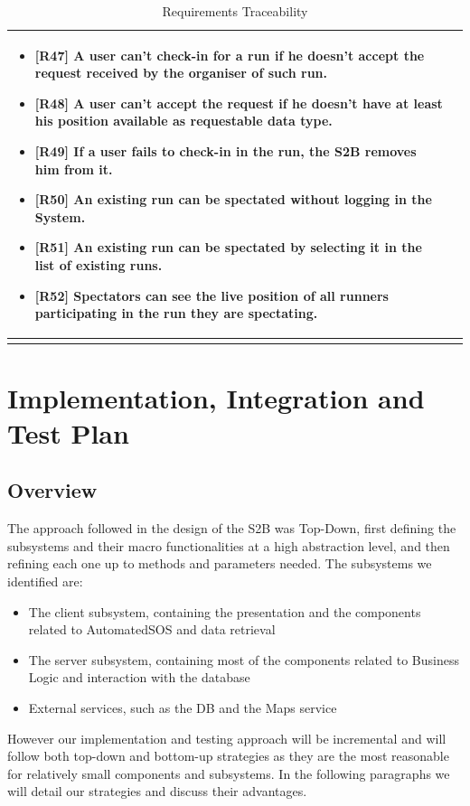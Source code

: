 \documentclass[titlepage]{article}
\begin{document}
\begin{longtable}{| p{5 cm} | p{8 cm} |}
\begin{itemize}
			\item {\bf [R47]} A user can’t check-in for a run if he doesn’t accept the request received by the organiser of such run.
			\item {\bf [R48]} A user can’t accept the request if he doesn’t have at least his position available as requestable data type.
			\item {\bf [R49]} If a user fails to check-in in the run, the S2B removes him from it.
			\item {\bf [R50]} An existing run can be spectated without logging in the System.
			\item {\bf [R51]} An existing run can be spectated by selecting it in the list of existing runs.
			\item {\bf [R52]} Spectators can see the live position of all runners participating in the run they are spectating.
		\end{itemize}		
		\\	 \hline		
		\caption{Requirements Traceability}	
						
	\end{longtable}

\pagebreak

\section{Implementation, Integration and Test Plan}
\subsection{Overview}
The approach followed in the design of the S2B was Top-Down, first defining the subsystems and their macro functionalities at a high abstraction level, and then refining each one up to methods and parameters needed. 
The subsystems we identified are:
\begin{itemize}
    \item The client subsystem, containing the presentation and the components related to AutomatedSOS and data retrieval
    \item The server subsystem, containing most of the components related to Business Logic and interaction with the database
    \item External services, such as the DB and the Maps service
\end{itemize}
However our implementation and testing approach will be incremental and will follow both top-down and bottom-up strategies as they are the most reasonable for relatively small components and subsystems. In the following paragraphs we will detail our strategies and discuss their advantages. 
\end{document}

